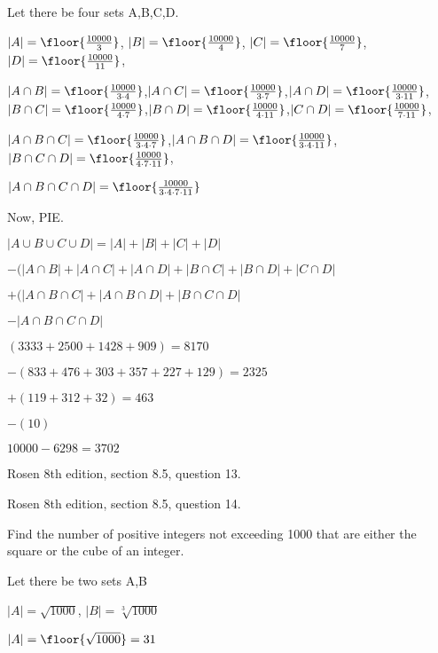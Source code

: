 Let there be four sets A,B,C,D.

$|A| = \floor{\frac{10000}{3}}$, $|B| = \floor{\frac{10000}{4}}$,
$|C| = \floor{\frac{10000}{7}}$,$|D| = \floor{\frac{10000}{11}}$,

$|A \cap B| = \floor{\frac{10000}{3 \cdot 4}}$,$|A \cap C| = \floor{\frac{10000}{3 \cdot 7}}$,$|A \cap D| = \floor{\frac{10000}{3 \cdot 11}}$,
$|B \cap C| = \floor{\frac{10000}{4 \cdot 7}}$,$|B \cap D| = \floor{\frac{10000}{4 \cdot 11}}$,$|C \cap D| = \floor{\frac{10000}{7 \cdot 11}}$,

$|A \cap B \cap C| = \floor{\frac{10000}{3 \cdot 4 \cdot 7}}$,$|A \cap B \cap D| = \floor{\frac{10000}{3 \cdot 4 \cdot 11}}$,$|B \cap C \cap D| = \floor{\frac{10000}{4 \cdot 7 \cdot 11}}$,

$|A \cap B \cap C \cap D| = \floor{\frac{10000}{3 \cdot 4 \cdot 7 \cdot 11}}$

Now, PIE.

$|A \cup B \cup C \cup D| = |A| + |B| + |C| + |D|$

$- (|A \cap B| + |A \cap C| + |A \cap D| + |B \cap C| + |B \cap D| + |C \cap D|$

$+ (|A \cap B \cap C| + |A \cap B \cap D| + |B \cap C \cap D|$

$- |A \cap B \cap C \cap D|$

$(3333 + 2500 + 1428 + 909) = 8170$

$-(833 + 476 + 303 + 357 + 227 + 129) = 2325$

$+(119 + 312 + 32) = 463$

$-(10)$

$10000 - 6298 = 3702$


\newpage
\nextq Rosen 8th edition, section 8.5, question 13.

\SOLUTION



\newpage
\nextq Rosen 8th edition, section 8.5, question 14.

\SOLUTION

Find the number of positive integers not exceeding 1000
that are either the square or the cube of an integer.

Let there be two sets A,B

$|A| = \sqrt{1000}$, $|B| = \sqrt[3]{1000}$

$|A| = \floor{\sqrt{1000}} = 31$

